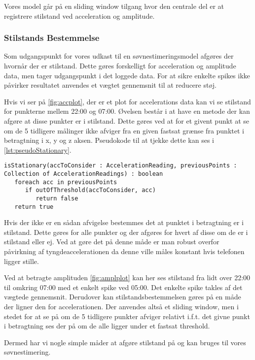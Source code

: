 Vores model går på en sliding window tilgang hvor den centrale del er at registrere stilstand ved acceleration og amplitude.
\subsubsection{Stilstands Bestemmelse}
Som udgangspunkt for vores udkast til en søvnestimeringsmodel afgøres der hvornår der er stilstand.
Dette gøres forskelligt for acceleration og amplitude data, men tager udgangspunkt i det loggede data.
For at sikre enkelte spikes ikke påvirker resultatet anvendes et vægtet gennemsnit til at reducere støj.

Hvis vi ser på \cref{fig:accplot}, der er et plot for accelerations data kan vi se stilstand for punkterne mellem 22:00 og 07:00.
Øvelsen består i at have en metode der kan afgøre at disse punkter er i stilstand.
Dette gøres ved at for et givent punkt at se om de 5 tidligere målinger ikke afviger fra en given fastsat grænse fra punktet i betragtning i x, y og z aksen.
Pseudokode til at tjekke dette kan ses i \cref{lst:pseudoStationary}.
\begin{lstlisting}[caption={Pseudo kode for at tjekke om et punkt er i stilstand.}, label={lst:pseudoStationary}]
isStationary(accToConsider : AccelerationReading, previousPoints : Collection of AccelerationReadings) : boolean
   foreach acc in previousPoints
      if outOfThreshold(accToConsider, acc)
         return false
   return true
\end{lstlisting}

Hvis der ikke er en sådan afvigelse bestemmes det at punktet i betragtning er i stilstand.
Dette gøres for alle punkter og der afgøres for hvert af disse om de er i stilstand eller ej.
Ved at gøre det på denne måde er man robust overfor påvirkning af tyngdeaccelerationen da denne ville måles konstant hvis telefonen ligger stille.

Ved at betragte amplituden \cref{fig:amplplot} kan her ses stilstand fra lidt over 22:00 til omkring 07:00 med et enkelt spike ved 05:00.
Det enkelte spike takles af det vægtede gennemsnit.
Derudover kan stilstandsbestemmelsen gøres på en måde der ligner den for accelerationen.
Der anvendes altså et sliding window, men i stedet for at se på om de 5 tidligere punkter afviger relativt i.f.t. det givne punkt i betragtning ses der på om de alle ligger under et fastsat threshold.

Dermed har vi nogle simple måder at afgøre stilstand på og kan bruges til vores søvnestimering.
